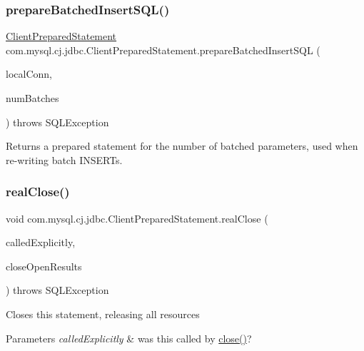 \subsubsection{\texorpdfstring{prepare\+Batched\+Insert\+S\+Q\+L()}{prepareBatchedInsertSQL()}}
{\footnotesize\ttfamily \mbox{\hyperlink{classcom_1_1mysql_1_1cj_1_1jdbc_1_1_client_prepared_statement}{Client\+Prepared\+Statement}} com.\+mysql.\+cj.\+jdbc.\+Client\+Prepared\+Statement.\+prepare\+Batched\+Insert\+S\+QL (\begin{DoxyParamCaption}\item[{\mbox{\hyperlink{interfacecom_1_1mysql_1_1cj_1_1jdbc_1_1_jdbc_connection}{Jdbc\+Connection}}}]{local\+Conn,  }\item[{int}]{num\+Batches }\end{DoxyParamCaption}) throws S\+Q\+L\+Exception\hspace{0.3cm}{\ttfamily [protected]}}

Returns a prepared statement for the number of batched parameters, used when re-\/writing batch I\+N\+S\+E\+R\+Ts. \mbox{\label{classcom_1_1mysql_1_1cj_1_1jdbc_1_1_client_prepared_statement_a352b21fa4a782cfad4065a227985201a}} 
\subsubsection{\texorpdfstring{real\+Close()}{realClose()}}
{\footnotesize\ttfamily void com.\+mysql.\+cj.\+jdbc.\+Client\+Prepared\+Statement.\+real\+Close (\begin{DoxyParamCaption}\item[{boolean}]{called\+Explicitly,  }\item[{boolean}]{close\+Open\+Results }\end{DoxyParamCaption}) throws S\+Q\+L\+Exception}

Closes this statement, releasing all resources


\begin{DoxyParams}{Parameters}
{\em called\+Explicitly} & was this called by \mbox{\hyperlink{classcom_1_1mysql_1_1cj_1_1jdbc_1_1_statement_impl_ac913294cd1adc42af73229a6ba2e4f0b}{close()}}?\\
\hline
\end{DoxyParams}

